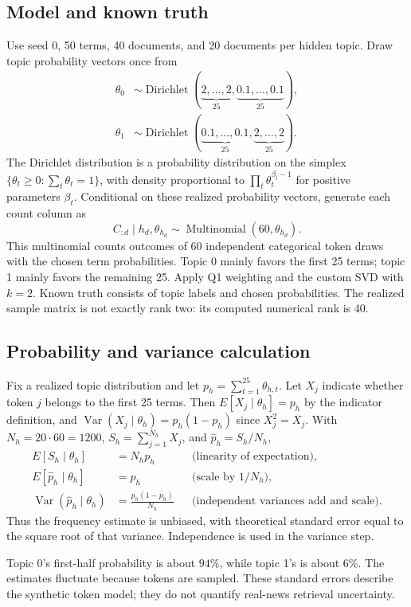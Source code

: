 \documentclass[11pt]{article}
\begin{document}
\subsection{Model and known truth}
Use seed 0, 50 terms, 40 documents, and 20 documents per hidden topic. Draw topic
probability vectors once from
\begin{align*}
\theta_0&\sim\operatorname{Dirichlet}(\underbrace{2,\ldots,2}_{25},
\underbrace{0.1,\ldots,0.1}_{25}),\\
\theta_1&\sim\operatorname{Dirichlet}(\underbrace{0.1,\ldots,0.1}_{25},
\underbrace{2,\ldots,2}_{25}).
\end{align*}
The Dirichlet distribution is a probability distribution on the simplex
$\{\theta_t\ge0:\sum_t\theta_t=1\}$, with density proportional to
$\prod_t\theta_t^{\beta_t-1}$ for positive parameters $\beta_t$.
Conditional on these realized probability vectors, generate each count column as
\[
C_{:d}\mid h_d,\theta_{h_d}\sim\operatorname{Multinomial}(60,\theta_{h_d}).
\]
This multinomial counts outcomes of 60 independent categorical token draws with
the chosen term probabilities. Topic 0 mainly favors the first 25 terms; topic 1
mainly favors the remaining 25. Apply Q1 weighting and the custom SVD with $k=2$.
Known truth consists of topic labels and chosen probabilities. The realized
sample matrix is not exactly rank two: its computed numerical rank is 40.

\subsection{Probability and variance calculation}
Fix a realized topic distribution and let $p_h=\sum_{t=1}^{25}\theta_{h,t}$.
Let $X_j$ indicate whether token $j$ belongs to the first 25 terms. Then
$E[X_j\mid\theta_h]=p_h$ by the indicator definition, and
$\operatorname{Var}(X_j\mid\theta_h)=p_h(1-p_h)$ since $X_j^2=X_j$.
With $N_h=20\cdot60=1200$, $S_h=\sum_{j=1}^{N_h}X_j$, and
$\widehat p_h=S_h/N_h$,
\begin{align*}
E[S_h\mid\theta_h]&=N_hp_h &&\text{(linearity of expectation)},\\
E[\widehat p_h\mid\theta_h]&=p_h &&\text{(scale by $1/N_h$)},\\
\operatorname{Var}(\widehat p_h\mid\theta_h)&=\frac{p_h(1-p_h)}{N_h}
&&\text{(independent variances add and scale)}.
\end{align*}
Thus the frequency estimate is unbiased, with theoretical standard error equal
to the square root of that variance. Independence is used in the variance step.

Topic 0's first-half probability is about $94\%$, while topic 1's is about $6\%$.
The estimates fluctuate because tokens are sampled. These standard errors describe
the synthetic token model; they do not quantify real-news retrieval uncertainty.
\end{document}
